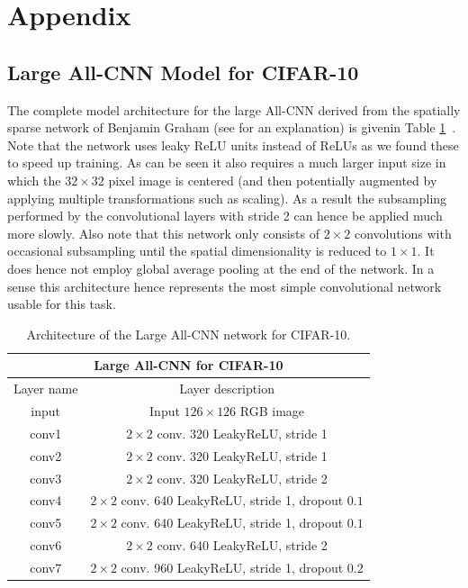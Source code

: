 \documentclass{article} %
\begin{document}
\section*{Appendix}
\begin{appendix}

\section{Large All-CNN Model for CIFAR-10}
The complete model architecture for the large All-CNN derived from the spatially sparse network of Benjamin Graham (see \citet{Graham2015} for an explanation) is givenin Table \ref{tbl:large_cifar_net}~. Note that the network uses leaky ReLU units instead of ReLUs as we found these to speed up training. As can be seen it also requires a much larger input size in which the $32 \times 32$ pixel image is centered (and then potentially augmented by applying multiple transformations such as scaling). As a result the subsampling performed by the convolutional layers with stride 2 can hence be applied much more slowly. Also note that this network only consists of $2 \times 2$ convolutions with occasional subsampling until the spatial dimensionality is reduced to $1\times 1$. It does hence not employ global average pooling at the end of the network. In a sense this architecture hence represents the most simple convolutional network usable for this task.
\begin{table}[h]
\caption{Architecture of the Large All-CNN network for CIFAR-10.}
\label{tbl:large_cifar_net}
\begin{center}
\begin{tabular}{c|c}
\multicolumn{2}{c}{\textbf{Large All-CNN for CIFAR-10}} \\ \hline
Layer name & Layer description \\ \hline
input & Input $126 \times 126$ RGB image\\
conv1 & $2 \times 2$ conv. 320 LeakyReLU, stride 1\\
conv2 & $2 \times 2$ conv. 320 LeakyReLU, stride 1\\
conv3 & $2 \times 2$ conv. 320 LeakyReLU, stride 2\\
conv4 & $2 \times 2$ conv. 640 LeakyReLU, stride 1, dropout $0.1$\\
conv5 & $2 \times 2$ conv. 640 LeakyReLU, stride 1, dropout $0.1$\\
conv6 & $2 \times 2$ conv. 640 LeakyReLU, stride 2 \\
conv7 & $2 \times 2$ conv. 960 LeakyReLU, stride 1, dropout $0.2$\\

\end{tabular}
\end{center}
\end{table}
\end{appendix}
\end{document}
